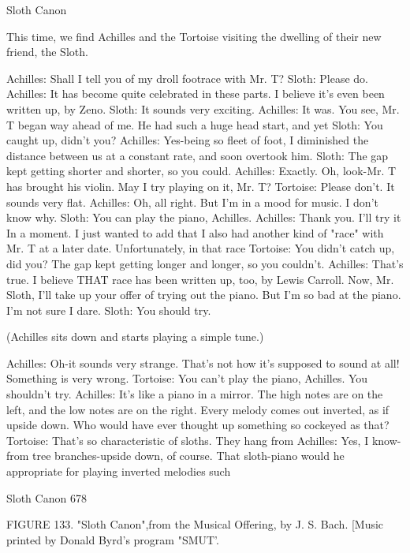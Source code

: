 
                                    Sloth Canon

                    This time, we find Achilles and the Tortoise visiting
                         the dwelling of their new friend, the Sloth.

Achilles: Shall I tell you of my droll footrace with Mr. T?
Sloth: Please do.
Achilles: It has become quite celebrated in these parts. I believe it's even been written up,
   by Zeno.
Sloth: It sounds very exciting.
Achilles: It was. You see, Mr. T began way ahead of me. He had such a huge head start,
   and yet
Sloth: You caught up, didn't you?
Achilles: Yes-being so fleet of foot, I diminished the distance between us at a constant
   rate, and soon overtook him.
Sloth: The gap kept getting shorter and shorter, so you could.
Achilles: Exactly. Oh, look-Mr. T has brought his violin. May I try playing on it, Mr. T?
Tortoise: Please don't. It sounds very flat.
Achilles: Oh, all right. But I'm in a mood for music. I don't know why. Sloth: You can
   play the piano, Achilles.
Achilles: Thank you. I'll try it In a moment. I just wanted to add that I also had another
   kind of "race" with Mr. T at a later date. Unfortunately, in that race
Tortoise: You didn't catch up, did you? The gap kept getting longer and longer, so you
   couldn't.
Achilles: That's true. I believe THAT race has been written up, too, by Lewis Carroll.
   Now, Mr. Sloth, I'll take up your offer of trying out the piano. But I'm so bad at the
   piano. I'm not sure I dare. Sloth: You should try.

   (Achilles sits down and starts playing a simple tune.)

Achilles: Oh-it sounds very strange. That's not how it's supposed to sound at all!
  Something is very wrong.
Tortoise: You can't play the piano, Achilles. You shouldn't try.
Achilles: It's like a piano in a mirror. The high notes are on the left, and the low notes are
  on the right. Every melody comes out inverted, as if upside down. Who would have
  ever thought up something so cockeyed as that?
Tortoise: That's so characteristic of sloths. They hang from
Achilles: Yes, I know-from tree branches-upside down, of course. That sloth-piano would
  he appropriate for playing inverted melodies such




Sloth Canon                                                                               678

FIGURE 133. "Sloth Canon",from the Musical Offering, by J. S. Bach. [Music printed
by Donald Byrd's program "SMUT'.


